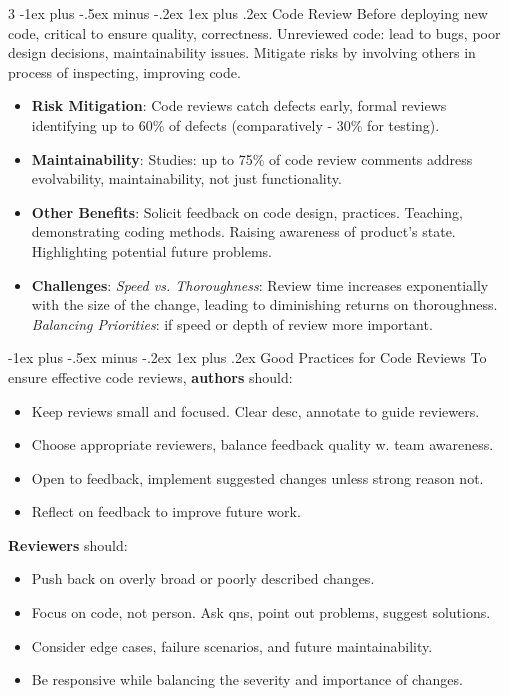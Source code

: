 \documentclass[a4paper, 10pt, landscape]{article}
\makeatletter
\renewcommand{\subsubsection}{\@startsection{subsubsection}{3}{0mm}%
                                {-1ex plus -.5ex minus -.2ex}%
                                {1ex plus .2ex}%
                                {\normalfont\small\bfseries}}
\makeatother
\begin{document}
\begin{multicols*}{3}
\subsubsection{Code Review}
Before deploying new code, critical to ensure quality, correctness. Unreviewed code: lead to bugs, poor design decisions, maintainability issues. Mitigate risks by involving others in process of inspecting, improving code.
\begin{itemize}[itemsep=-1pt]
    \item \textbf{Risk Mitigation}: Code reviews catch defects early, formal reviews identifying up to 60\% of defects (comparatively - 30\% for testing).
    \item \textbf{Maintainability}: Studies: up to 75\% of code review comments address evolvability, maintainability, not just functionality.
    \item \textbf{Other Benefits}: Solicit feedback on code design, practices. Teaching, demonstrating coding methods. Raising awareness of product's state. Highlighting potential future problems.
  	\item \textbf{Challenges}: \textit{Speed vs. Thoroughness}: Review time increases exponentially with the size of the change, leading to diminishing returns on thoroughness. \textit{Balancing Priorities}: if speed or depth of review more important.
\end{itemize}

\subsubsection{Good Practices for Code Reviews}
To ensure effective code reviews, \textbf{authors} should:
\begin{itemize}[itemsep=-1pt]
    \item Keep reviews small and focused. Clear desc, annotate to guide reviewers.
    \item Choose appropriate reviewers, balance feedback quality w. team awareness.
    \item Open to feedback, implement suggested changes unless strong reason not.
    \item Reflect on feedback to improve future work.
\end{itemize}
\textbf{Reviewers} should:
\begin{itemize}[itemsep=-1pt]
    \item Push back on overly broad or poorly described changes.
    \item Focus on code, not person. Ask qns, point out problems, suggest solutions.
    \item Consider edge cases, failure scenarios, and future maintainability.
    \item Be responsive while balancing the severity and importance of changes.
\end{itemize}


\end{multicols*}
\end{document}
